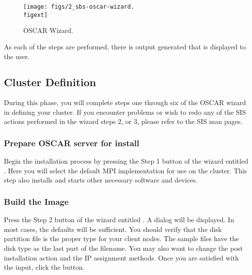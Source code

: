 \begin{figure}[htbp]
  \begin{center}
    \texttt{[image: figs/2\_sbs-oscar-wizard.\\figext]}
    \caption{OSCAR Wizard.}
    \label{fig:detailed-oscar-wizard}
  \end{center}
\end{figure}
  
As each of the steps are performed, there is output generated that is
displayed to the user. 


\subsection{Cluster Definition}
\label{sec:detailed-cluster-def}

During this phase, you will complete steps one through six of the
OSCAR wizard in defining your cluster. If you encounter problems or
wish to redo any of the SIS actions performed in the wizard steps 2,
or 3, please refer to the SIS man pages.

\begchange %
\subsubsection{Prepare OSCAR server for install} 
\label{det:prepareforinstall}
Begin the installation process by pressing the Step 1 button of the wizard entitled . Here you will select the default MPI implementation for use on the cluster. This step also installs and starts other necessary software and devices.
\endchange

\subsubsection{Build the Image} 
\label{det:buildimage}

Press the Step 2 button of the wizard entitled . A dialog will be displayed. In most cases, the defaults 
will be sufficient. You should verify that the disk partition file is
the proper type for your client nodes. The sample files have the
disk type as the last part of the filename. You may also want to change
the post installation action and the IP assignment methods.
Once you are satisfied with the input, click the  button.

